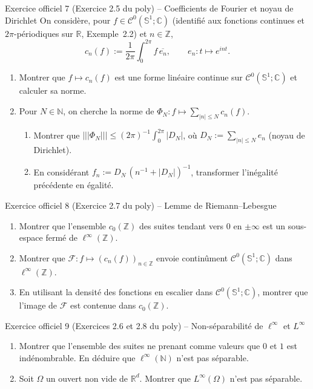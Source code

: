 \documentclass[11pt,a4paper]{article}
\newcommand{\R}{\mathbb{R}}
\newcommand{\N}{\mathbb{N}}
\newcommand{\Z}{\mathbb{Z}}
\newcommand{\C}{\mathbb{C}}
\newcommand{\Sun}{\mathbb{S}^1}
\newcommand{\opnorm}[1]{|\!|\!|#1|\!|\!|}
\newcommand{\Cz}{\mathcal{C}^0}
\theoremstyle{definition}
\begin{document}
\begin{exo}{Exercice officiel 7 (Exercice 2.5 du poly) -- Coefficients de Fourier et noyau de Dirichlet}
On considère, pour $f\in\Cz(\Sun;\C)$ (identifié aux fonctions continues et $2\pi$-périodiques sur $\R$, Exemple~2.2) et $n\in\Z$,
\[
c_n(f):=\frac1{2\pi}\int_0^{2\pi}f\,\overline{e_n},\qquad e_n:t\mapsto e^{int}.
\]
\begin{enumerate}[label=(\alph*)]
  \item Montrer que $f\mapsto c_n(f)$ est une forme linéaire continue sur $\Cz(\Sun;\C)$ et calculer sa norme.
  \item Pour $N\in\N$, on cherche la norme de $\Phi_N:f\mapsto\sum_{|n|\le N}c_n(f)$.
  \begin{enumerate}[label=(b.\arabic*)]
    \item Montrer que $\opnorm{\Phi_N}\le(2\pi)^{-1}\int_0^{2\pi}|D_N|$, où $D_N:=\sum_{|n|\le N}e_n$ (noyau de Dirichlet).
    \item En considérant $f_n:=D_N\,(n^{-1}+|D_N|)^{-1}$, transformer l'inégalité précédente en égalité.
  \end{enumerate}
\end{enumerate}
\end{exo}

\begin{exo}{Exercice officiel 8 (Exercice 2.7 du poly) -- Lemme de Riemann--Lebesgue}
\begin{enumerate}[label=(\alph*)]
  \item Montrer que l'ensemble $c_0(\Z)$ des suites tendant vers $0$ en $\pm\infty$ est un sous-espace fermé de $\ell^\infty(\Z)$.
  \item Montrer que $\mathcal F:f\mapsto(c_n(f))_{n\in\Z}$ envoie continûment $\Cz(\Sun;\C)$ dans $\ell^\infty(\Z)$.
  \item En utilisant la densité des fonctions en escalier dans $\Cz(\Sun;\C)$, montrer que l'image de $\mathcal F$ est contenue dans $c_0(\Z)$.
\end{enumerate}
\end{exo}

\begin{exo}{Exercice officiel 9 (Exercices 2.6 et 2.8 du poly) -- Non-séparabilité de $\ell^\infty$ et $L^\infty$}
\begin{enumerate}[label=(\alph*)]
  \item Montrer que l'ensemble des suites ne prenant comme valeurs que $0$ et $1$ est indénombrable. En déduire que $\ell^\infty(\N)$ n'est pas séparable.
  \item Soit $\Omega$ un ouvert non vide de $\R^d$. Montrer que $L^\infty(\Omega)$ n'est pas séparable.
\end{enumerate}
\end{exo}
\end{document}

